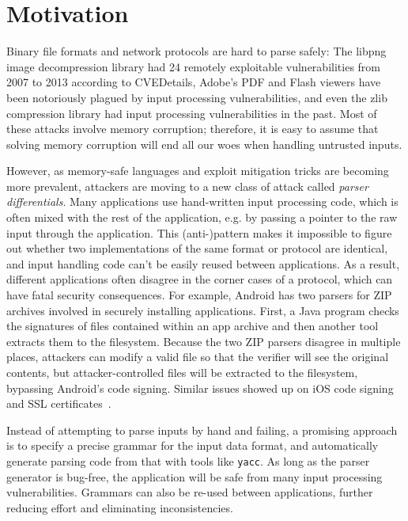 \documentclass[a4paper]{article}
\begin{document}
\newpage

\section{Motivation}
Binary file formats and network protocols are hard to parse safely: 
The libpng image decompression library had 24 remotely
exploitable vulnerabilities from 2007 to 2013 according to CVEDetails,
Adobe's PDF and Flash viewers have been notoriously plagued by input
processing vulnerabilities, and even the zlib compression library had
input processing vulnerabilities in the past.
Most of these attacks involve memory corruption; therefore, it is easy to assume that 
solving memory corruption will end all our woes when handling untrusted inputs. 

However, as memory-safe languages and exploit mitigation  tricks are becoming more prevalent,
attackers are moving to a new class of attack called {\em parser differentials}. Many applications use
hand-written input processing code, which is often mixed with the rest of the application, e.g. by
passing a pointer to the raw input through the application. This (anti-)pattern makes it impossible
to figure out whether two implementations of the same format or protocol are identical, and input
handling code can't be easily reused between applications. As a result, different applications often
disagree in the corner cases of a protocol, which can have fatal security consequences. For example,
Android has two parsers for ZIP archives involved in securely installing applications. First, a Java
program checks the signatures of files contained within an app archive and then another tool
extracts them to the filesystem. Because the two ZIP parsers disagree in multiple places, attackers
can modify a valid file so that the verifier will see the original contents, but attacker-controlled
files will be extracted to the filesystem, bypassing Android's code signing. Similar issues showed
up on iOS code signing~\cite{geohot-evasion} and SSL certificates~\cite{DBLP:conf/fc/KaminskyPS10}.


Instead of attempting to parse inputs by hand and failing, 
a promising approach is to specify
a precise grammar for the input data format, and automatically generate parsing code from that with tools like {\tt yacc}. As long
as the parser generator is bug-free, the application will be safe from many
input processing vulnerabilities. Grammars can also be re-used between
applications, further reducing effort and eliminating inconsistencies.
\end{document}
